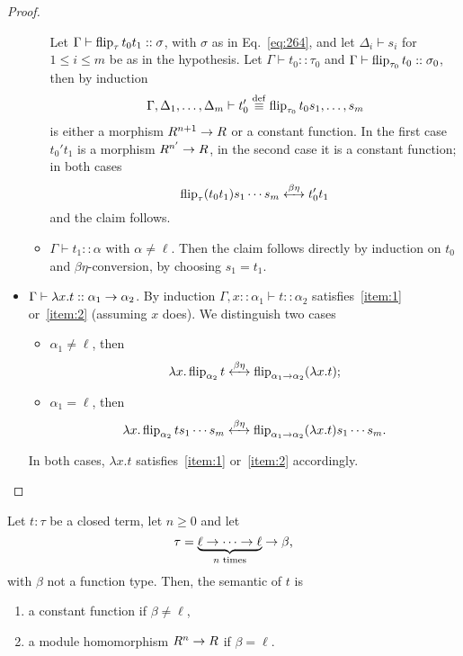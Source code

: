 \begin{proof}
\begin{itemize}
\begin{itemize}
      Let $\Gamma\vdash \operatorname{flip}_\tau t_0t_1::\sigma$, with $\sigma$ as in
      Eq.~\eqref{eq:264}, and let $\Delta_i\vdash s_i$ for $1\le i\le
      m$ be as in the hypothesis.  Let $\Gamma\vdash t_0::\tau_0$ and
      $\Gamma\vdash\operatorname{flip}_{\tau_0}t_0::\sigma_0$, then by induction
      \begin{equation}
        \label{eq:271}
        \Gamma,\Delta_1,\ldots,\Delta_m\vdash t_0'\overset{\mathrm{def}}{\equiv}\operatorname{flip}_{\tau_0}t_0s_1,\ldots,s_m
      \end{equation}
      is either a morphism $R^{n+1}\rightarrow R$ or a constant function. In
      the first case $t_0't_1$ is a morphism $R^{n'}\rightarrow R$, in the second
      case it is a constant function; in both cases
      \begin{equation}
        \label{eq:74}
        \operatorname{flip}_\tau(t_0t_1)s_1\cdots s_m\xleftrightarrow{\beta\eta}t_0't_1        
      \end{equation}
      and the claim follows.
    \item $\Gamma\vdash t_1::\alpha$ with $\alpha\ne\ell$. Then the
      claim follows directly by induction on $t_0$ and
      $\beta\eta$-conversion, by choosing $s_1=t_1$.
    \end{itemize}
  \item $\Gamma\vdash \lambda x.t::\alpha_1\rightarrow\alpha_2$. By induction
    $\Gamma,x::\alpha_1\vdash t::\alpha_2$ satisfies~\ref{item:1}
    or~\ref{item:2} (assuming $x$ does). We distinguish two cases
    \begin{itemize}
    \item $\alpha_1\ne\ell$, then
      \begin{equation}
        \label{eq:73}
        \lambda x.\operatorname{flip}_{\alpha_2}t\xleftrightarrow{\beta\eta}\operatorname{flip}_{\alpha_1\rightarrow\alpha_2}(\lambda x.t)
        \text{;}
      \end{equation}
    \item $\alpha_1=\ell$, then
      \begin{equation}
        \label{eq:76}
        \lambda x.\operatorname{flip}_{\alpha_2}ts_1\cdots s_m\xleftrightarrow{\beta\eta}
        \operatorname{flip}_{\alpha_1\rightarrow\alpha_2}(\lambda x.t)s_1\cdots s_m
        \text{.}
      \end{equation}
    \end{itemize}
    In both cases, $\lambda x.t$ satisfies~\ref{item:1}
    or~\ref{item:2} accordingly.
  \end{itemize}
\end{proof}

\begin{proposition}
  Let $t:\tau$ be a closed term, let $n\ge0$ and let
  \begin{equation}
    \tau=\underbrace{\ell\rightarrow\cdots\rightarrow\ell}_{\text{$n$ times}}\rightarrow\beta
    \text{,}    
  \end{equation}
  with $\beta$ not a function type. Then, the semantic of $t$ is
  \begin{enumerate}
  \item a constant function if $\beta\ne\ell$,
  \item a module homomorphism $R^n\rightarrow R$ if $\beta=\ell$.
  \end{enumerate}
\end{proposition}

